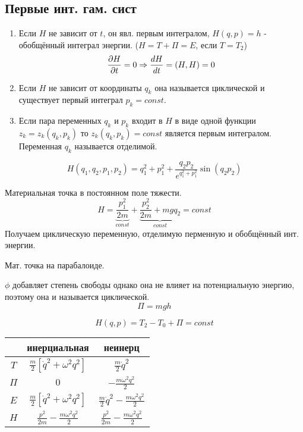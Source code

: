 \documentclass{article}
\begin{document}
\subsection{Первые инт. гам. сист}
\begin{enumerate}
  \item Если $H$ не зависит от $t$, он явл. первым интегралом,
    $H(q,p)=h$ - обобщённый интеграл энергии. ($H=T+\Pi=E$, если $T=T_2$)
    \[
      \frac{\partial{H}}{\partial{t}}=0 \Rightarrow \frac{dH}{dt}=(H,H)=0
    \]
  \item Если $H$ не зависит от координаты $q_k$ она называется циклической
    и существует первый интеграл $p_k=const$.
  \item Если пара переменных $q_k$ и $p_k$ входит в $H$ в виде одной функции
    $z_k=z_k(q_k,p_k)$ то $z_k(q_k,p_k)=const$ является первым интегралом.
    Переменная $q_k$ называется отделимой.
\end{enumerate}
\begin{eg}
  \[
    H(q_1,q_2,p_1,p_2)=q_1^{2}+p_1^{2}+\frac{q_2p_2}{e^{q_1^{2}+p_1^{2}}}\sin(q_2p_2)
  \]
\end{eg}
\begin{eg}

  Материальная точка в постоянном поле тяжести.
  \[
    H=\underbrace{\frac{p_1^{2}}{2m}}_{const}+\underbrace{\frac{p_2^{2}}{2m}+mgq_2}_{const}=const
  \]
  Получаем циклическую переменную, отделимую перменную и обобщённый инт. энергии.
\end{eg}
\begin{eg}
  Мат. точка на парабалоиде.

  $\phi$ добавляет степень свободы однако она не влияет на потенциальную энергию,
  поэтому она и называется циклической.
  \[
    \Pi=mgh
  \]
\end{eg}
\begin{eg}
  \[
    H(q,p)=T_2-T_0+\Pi=const
  \]

  \begin{center}
  \begin{tabular}{| c | c | c |}
    \hline
     & инерциальная & неинерц \\
    \hline
    $T$ & $\frac{m}{2}[\dot{q}^{2}+\omega^{2}q^{2}]$ & $\frac{m}{2}\dot{q}^{2}$  \\
    \hline
    $\Pi$ & $0$ & $-\frac{m\omega^{2}q^{2}}{2}$ \\ 
    \hline
    $E$ & $\frac{m}{2}[\dot{q}^{2}+\omega^{2}q^{2}]$ & $\frac{m}{2}\dot{q}^{2}-\frac{m\omega^{2}q^{2}}{2}$ \\
    \hline
    $H$ & $\frac{p^{2}}{2m}-\frac{m\omega^{2}q^{2}}{2}$ & $\frac{p^{2}}{2m}-\frac{m\omega^{2}q^{2}}{2}$\\
    \hline
  \end{tabular}
  \end{center}
\end{eg}
\end{document}
